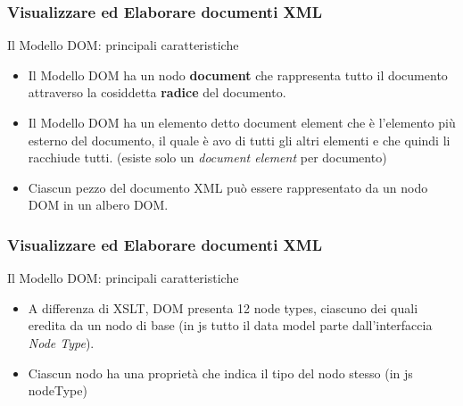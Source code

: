 \begin{frame}
    \frametitle{Visualizzare ed Elaborare documenti XML}
    \addtocounter{nframe}{1}
    

     \begin{block}{Il Modello DOM: principali caratteristiche}
        \begin{itemize}
            \item Il Modello DOM ha un nodo \textbf{document} che rappresenta tutto il documento attraverso la cosiddetta \textbf{radice} del documento.
            \item Il Modello DOM ha un elemento detto document element che è l'elemento più esterno del documento, il quale è avo di tutti gli altri elementi e che quindi li racchiude tutti. (esiste solo un \textit{document element} per documento)
            \item Ciascun pezzo del documento XML può essere rappresentato da un nodo DOM in un albero DOM.
        \end{itemize}
     \end{block}
     
\end{frame}

\begin{frame}
    \frametitle{Visualizzare ed Elaborare documenti XML}
    \addtocounter{nframe}{1}
    

     \begin{block}{Il Modello DOM: principali caratteristiche}
        \begin{itemize}
            \item A differenza di XSLT, DOM presenta 12 node types, ciascuno dei quali eredita da un nodo di base (in js tutto il data model parte dall'interfaccia \textit{Node Type}).
            \item Ciascun nodo ha una proprietà che indica il tipo del nodo stesso (in js nodeType)
        \end{itemize}
     \end{block}
     
\end{frame}

